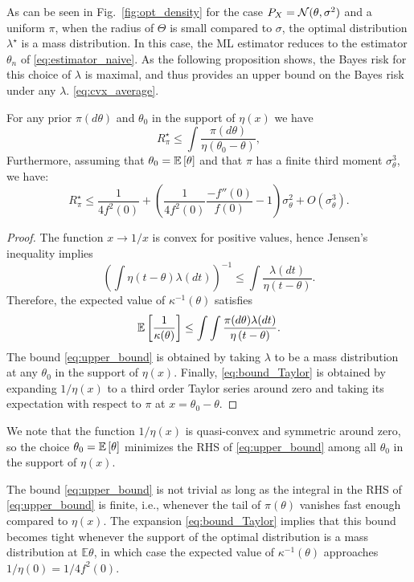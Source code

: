 As can be seen in Fig.~\ref{fig:opt_density} for the case $P_X = \mathcal{N}(\theta ,\sigma^2)$ and a uniform $\pi$, when the radius of $\Theta$ is small compared to $\sigma$, the optimal distribution $\lambda^\star$ is a mass distribution. In this case, the ML estimator reduces to the estimator ${\theta}_n$ of \eqref{eq:estimator_naive}. As the following proposition shows, the Bayes risk for this choice of $\lambda$ is maximal, and thus provides an upper bound on the Bayes risk under any $\lambda$. 
 \eqref{eq:cvx_average}. 
\begin{prop}\label{prop:upper_bound}
For any prior $\pi(d\theta)$ and $\theta_0$ in the support of $\eta(x)$ we have
\begin{equation} 
\label{eq:upper_bound}
R_\pi^\star  \leq 
 \int \frac{\pi(d\theta)}{\eta \left( \theta_0 - \theta \right)},
\end{equation}
Furthermore, assuming that $\theta_0 = \mathbb{E}\left[ \theta\right]$ and that $\pi$ has a finite third moment $\sigma_\theta^3$, we have: 
\begin{equation}
\label{eq:bound_Taylor}
R^\star_\pi \leq \frac{1}{4 f^2(0)} + \left(\frac{1}{4 f^2(0)} \frac{-f''(0)}{f(0)} -1 \right) \sigma_\theta^2 + O(\sigma_\theta^3).
\end{equation}
\end{prop}
\begin{proof}
The function $x \rightarrow 1/x$ is convex for positive values, hence Jensen's inequality implies
\[
\left( \int \eta \left( t-\theta\right) \lambda(dt) \right)^{-1}  \leq \int  \frac{ \lambda(dt)}{ \eta \left( t-\theta\right)  }. 
\]
Therefore, the expected value of $\kappa^{-1}(\theta)$ satisfies
\begin{align}
\mathbb{E}\left[   \frac{1}{\kappa(\theta)}\right]  \leq \int \int \frac{\pi(d\theta) \lambda(dt) }{\eta \left( t - \theta \right)}. \label{eq:upper_bound_proof}
\end{align}
The bound \eqref{eq:upper_bound} is obtained by taking $\lambda$ to be a mass distribution at any $\theta_0$ in the support of $\eta(x)$. Finally, \eqref{eq:bound_Taylor} is obtained by expanding $1/\eta(x)$ to a third order Taylor series around zero
and taking its expectation with respect to $\pi$ at $x=\theta_0-\theta$. 
\end{proof}
We note that the function $1/\eta(x)$ is quasi-convex and symmetric around zero, so the choice $\theta_0 = \mathbb{E}\left[  \theta\right]$ minimizes the RHS of \eqref{eq:upper_bound} among all $\theta_0$ in the support of $\eta(x)$.\par
The bound \eqref{eq:upper_bound} is not trivial as long as the integral in the RHS of \eqref{eq:upper_bound} is finite, i.e., whenever the tail of $\pi(\theta)$ vanishes fast enough compared to $\eta(x)$. The expansion \eqref{eq:bound_Taylor} implies that this bound becomes tight whenever the support of the optimal distribution is a mass distribution at $\mathbb E \theta$, in which case the expected value of $\kappa^{-1}(\theta)$ approaches $1/\eta(0) = 1/4f^2(0)$. 

